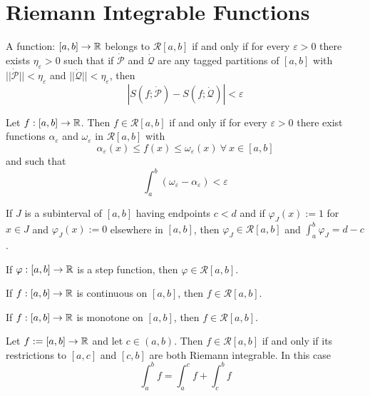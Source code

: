 \section{Riemann Integrable Functions}

\begin{theorem}
	A function: $[a,b] \to \mathbb{R}$ belongs to $\mathcal{R}[a,b]$ if and only if for every $\varepsilon >0$ there exists $\eta_\varepsilon > 0$ such that if $\dot{\mathcal{P}}$ and $\dot{\mathcal{Q}}$ are any tagged partitions of $[a,b]$ with $||\dot{\mathcal{P}}||<\eta_\varepsilon$ and $||\dot{\mathcal{Q}}||<\eta_\varepsilon$, then
	\[|S(f;\dot{\mathcal{P}})-S(f;\dot{\mathcal{Q}})|<\varepsilon\]
\end{theorem}

\begin{theorem}
	Let $f:[a,b] \to \mathbb{R}$. Then $f \in \mathcal{R}[a,b]$ if and only if for every $\varepsilon>0$ there exist functions $\alpha_\varepsilon$ and $\omega_\varepsilon$ in $\mathcal{R}[a,b]$ with
	\[\alpha_\varepsilon(x) \leq f(x) \leq \omega_\varepsilon(x)\ \forall\ x \in [a,b]\]
	and such that
	\[\displaystyle\int_{a}^{b}(\omega_\varepsilon-\alpha_\varepsilon)<\varepsilon\]
\end{theorem}

\begin{lemma}
	If $J$ is a subinterval of $[a,b]$ having endpoints $c < d$ and if $\varphi_J(x):=1$ for $x \in J$ and $\varphi_J(x):=0$ elsewhere in $[a,b]$, then $\varphi_J \in \mathcal{R}[a,b]$ and $\displaystyle\int_{a}^{b}\varphi_J=d-c$.
\end{lemma}

\begin{theorem}
	If $\varphi:[a,b] \to \mathbb{R}$ is a step function, then $\varphi \in \mathcal{R}[a,b]$.
\end{theorem}

\begin{theorem}
	If $f:[a,b] \to \mathbb{R}$ is continuous on $[a,b]$, then $f \in \mathcal{R}[a,b]$.
\end{theorem}

\begin{theorem}
	If $f:[a,b]\to\mathbb{R}$ is monotone on $[a,b]$, then $f \in \mathcal{R}[a,b]$.
\end{theorem}

\begin{theorem}
	Let $f:=[a,b] \to \mathbb{R}$ and let $c \in (a,b)$. Then $f \in \mathcal{R}[a,b]$ if and only if its restrictions to $[a,c]$ and $[c,b]$ are both Riemann integrable. In this case
	\[\displaystyle\int_{a}^{b}f=\displaystyle\int_{a}^{c}f+\displaystyle\int_{c}^{b}f\]
\end{theorem}

